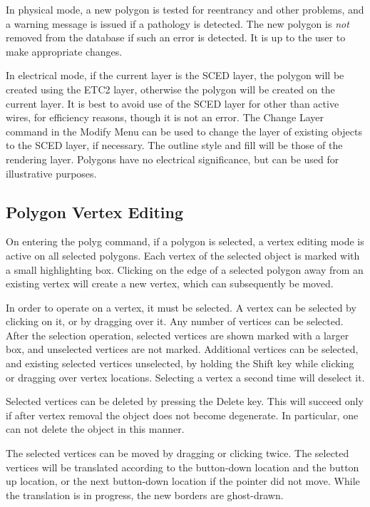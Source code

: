 In physical mode, a new polygon is tested for reentrancy and other
problems, and a warning message is issued if a pathology is detected. 
The new polygon is {\it not} removed from the database if such an
error is detected.  It is up to the user to make appropriate changes.

In electrical mode, if the current layer is the SCED layer, the
polygon will be created using the ETC2 layer, otherwise the polygon
will be created on the current layer.  It is best to avoid use of the
SCED layer for other than active wires, for efficiency reasons, though
it is not an error.  The {\cb Change Layer} command in the {\cb Modify
Menu} can be used to change the layer of existing objects to the SCED
layer, if necessary.  The outline style and fill will be those of the
rendering layer.  Polygons have no electrical significance, but can be
used for illustrative purposes. 

\subsection{Polygon Vertex Editing}

On entering the {\cb polyg} command, if a polygon is selected, a
vertex editing mode is active on all selected polygons.  Each vertex
of the selected object is marked with a small highlighting box. 
Clicking on the edge of a selected polygon away from an existing
vertex will create a new vertex, which can subsequently be moved.

In order to operate on a vertex, it must be selected.  A vertex can be
selected by clicking on it, or by dragging over it.  Any number of
vertices can be selected.  After the selection operation, selected
vertices are shown marked with a larger box, and unselected vertices
are not marked.  Additional vertices can be selected, and existing
selected vertices unselected, by holding the {\kb Shift} key while
clicking or dragging over vertex locations.  Selecting a vertex a
second time will deselect it.

Selected vertices can be deleted by pressing the {\kb Delete} key. 
This will succeed only if after vertex removal the object does not
become degenerate.  In particular, one can not delete the object in
this manner.

The selected vertices can be moved by dragging or clicking twice.  The
selected vertices will be translated according to the button-down
location and the button up location, or the next button-down location
if the pointer did not move.  While the translation is in progress,
the new borders are ghost-drawn.

